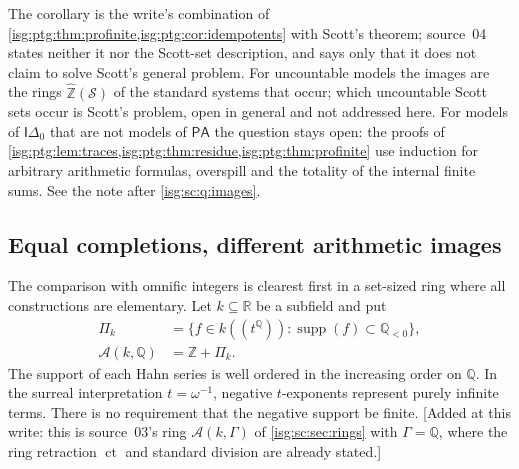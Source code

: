\documentclass[11pt]{article}
\theoremstyle{definition}
\theoremstyle{remark}
\newcommand{\R}{\mathbb{R}}
\newcommand{\Z}{\mathbb{Z}}
\newcommand{\supp}{\operatorname{supp}}
\newcommand{\ct}{\operatorname{ct}}
\newcommand{\Q}{\mathbb{Q}}
\newcommand{\Zhat}{\widehat{\Z}}
\newcommand{\Idelta}{\mathsf{I}\Delta_0}
\newcommand{\Asc}{\mathcal{A}}
\newcommand{\PA}{\mathsf{PA}}
\begin{document}
The corollary is the write's combination of \cref{isg:ptg:thm:profinite,isg:ptg:cor:idempotents}
with Scott's theorem; source~04 states neither it nor the Scott-set
description, and says only that it does not claim to solve Scott's general
problem. For uncountable models the images are the rings $\Zhat(\mathcal S)$
of the standard systems that occur; which uncountable Scott sets occur is
Scott's problem, open in general and not addressed here. For models of
$\Idelta$ that are not models of $\PA$ the question stays open: the proofs
of \cref{isg:ptg:lem:traces,isg:ptg:thm:residue,isg:ptg:thm:profinite} use
induction for arbitrary arithmetic formulas, overspill and the totality of
the internal finite sums. See the note after \cref{isg:sc:q:images}.

\subsection{Equal completions, different arithmetic images}\label{isg:ptg:sec:comparison}
The comparison with omnific integers is clearest first in a set-sized ring
where all constructions are elementary. Let $k\subseteq\R$ be a subfield and
put
\begin{align}
 \Pi_k&=\{f\in k((t^\Q)):\supp(f)\subset\Q_{<0}\},\label{isg:ptg:eq:tail}\\
 \Asc(k,\Q)&=\Z+\Pi_k.\label{isg:ptg:eq:tailring}
\end{align}
The support of each Hahn series is well ordered in the increasing order on
$\Q$. In the surreal interpretation $t=\omega^{-1}$, negative $t$-exponents
represent purely infinite terms. There is no requirement that the negative
support be finite. \textup{[}Added at this write: this is source~03's ring
$\Asc(k,\Gamma)$ of \cref{isg:sc:sec:rings} with $\Gamma=\Q$, where the
ring retraction $\ct$ and standard division are already stated.\textup{]}
\end{document}
